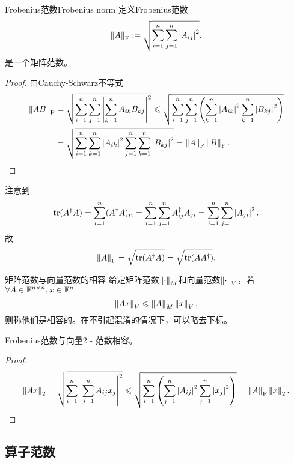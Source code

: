 \newcommand{\Forb}[1]{\norm{#1}_{\mathrm F}}


\begin{example}
    {Frobenius范数}{Frobenius norm}
    定义Frobenius范数
    \begin{equation}
        \Forb A:=\sqrt{\sum_{i=1}^n\sum_{j=1}^n\abs{A_{ij}}^2}.
    \end{equation}
    是一个矩阵范数。
    \begin{proof}
        由Cauchy-Schwarz不等式
        \begin{align*}
            \Forb{AB}&=\sqrt{\sum_{i=1}^n\sum_{j=1}^n\abs{\sum_{k=1}^nA_{ik}B_{kj}}^2}\leq\sqrt{\sum_{i=1}^n\sum_{j=1}^n\kh{\sum_{k=1}^n\abs{A_{ik}}^2\sum_{k=1}^n\abs{B_{kj}}^2}}\\
            &=\sqrt{\sum_{i=1}^n\sum_{k=1}^n\abs{A_{ik}}^2\sum_{j=1}^n\sum_{k=1}^n\abs{B_{kj}}^2}=\Forb A\Forb B.
            \qedhere
        \end{align*}
    \end{proof}
    \tcblower
    注意到
    \[
        \operatorname{tr}(A^\dagger A)=\sum_{i=1}^n(A^\dagger A)_{ii}=\sum_{i=1}^n\sum_{j=1}^nA^\dagger_{ij}A_{ji}=\sum_{i=1}^n\sum_{j=1}^n\left\lvert A_{ji}\right\rvert^2.
    \]
    故
    \begin{equation}
        \Forb A=\sqrt{\tr(A\dg A)}=\sqrt{\tr(AA\dg)}.
    \end{equation}
\end{example}

\begin{definition}
    {矩阵范数与向量范数的相容}{}
    给定矩阵范数$\left\lVert\cdot\right\rVert_M$和向量范数$\left\lVert\cdot\right\rVert_V$，若$\forall A\in\mathbb F^{n\times n},x\in\mathbb F^n$ 
    \begin{equation}
        \left\lVert Ax\right\rVert_V\leqslant\left\lVert A\right\rVert_M\left\lVert x\right\rVert_V,
    \end{equation}
    则称他们是相容的。在不引起混淆的情况下，可以略去下标。
\end{definition}

\begin{theorem}
    {}{}
    Frobenius范数与向量2 - 范数相容。
\end{theorem}

\begin{proof}
    \[
        \norm{Ax}_2=\sqrt{\sum_{i=1}^n\abs{\sum_{j=1}^n A_{ij}x_j}^2}\leq\sqrt{\sum_{i=1}^n\kh{\sum_{j=1}^n\abs{A_{ij}}^2\sum_{j=1}^n\abs{x_j}^2}}=\Forb A\norm x_2.
        \qedhere
    \]
\end{proof}

\subsection{算子范数}

